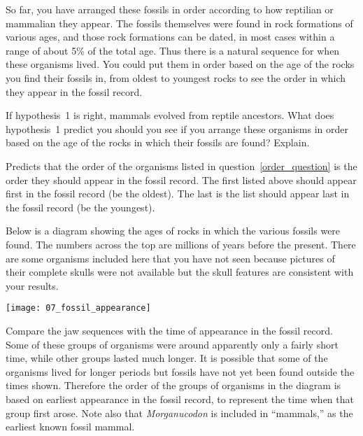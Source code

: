 \documentclass[12pt, hidelinks]{exam}
\newcommand*\AnswerBox[2]{%
    \parbox[t][#1]{0.92\textwidth}{%
    \begin{solution}#2\end{solution}}
    \vspace{\stretch{1}}
}
\begin{document}
\begin{questions}
So far, you have arranged these fossils in order according to how reptilian or mammalian they appear.  The fossils themselves were found in rock formations of various ages, and those rock formations can be dated, in most cases within a range of about 5\% of the total age.  Thus there is a natural sequence for when these organisms lived.  You could put them in order based on the age of the rocks you find their fossils in, from oldest to youngest rocks to see the order in which they appear in the fossil record. 

\question
If hypothesis~1 is right, mammals evolved from reptile ancestors.  What does hypothesis~1 predict you should you see if you arrange these organisms in order based on the age of the rocks in which their fossils are found?  Explain.

\AnswerBox{4\baselineskip}{%
	Predicts that the order of the organisms listed in question~\ref{order_question} is the order they should appear in the fossil record. The first listed above should appear first in the fossil record (be the oldest). The last is the list should appear last in the fossil record (be the youngest). 
}

%
%
Below is a diagram showing the ages of rocks in which the various
fossils were found. The numbers across the top are millions of
years before the present. There are some organisms included here that you
have not seen because pictures of their complete skulls were not available 
but the skull features are consistent with your results.

\begin{center}
\texttt{[image: 07\_fossil\_appearance]}
\end{center}

Compare the jaw sequences with the time of appearance in the
fossil record. Some of these groups of organisms were around apparently
only a fairly short time, while other groups lasted much longer. It is possible
that some of the organisms lived for longer periods but fossils have not yet been
found outside the times shown. Therefore the order of the groups of organisms in the diagram is based on earliest
appearance in the fossil record, to represent the time when that
group first arose. Note also that \textit{Morganucodon} is included
in ``mammals,'' as the earliest known
fossil mammal.


\end{questions}
\end{document}
